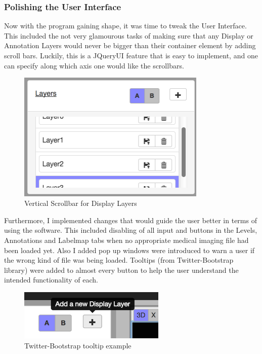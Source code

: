 \documentclass[a4paper,11pt,titlepage]{article}
\begin{document}
\subsubsection{Polishing the User Interface}

Now with the program gaining shape, it was time to tweak the User Interface. This included the not very glamourous tasks of making sure that any Display or Annotation Layers would never be bigger than their container element by adding scroll bars. Luckily, this is a JQueryUI feature that is easy to implement, and one can specify along which axis one would like the scrollbars.

\begin{figure}[ht!]
\centering
\includegraphics[width=90mm]{graphics/scrollbar_01.png}
\caption{Vertical Scrollbar for Display Layers}
\label{fig:UIdesign1}
\end{figure}

Furthermore, I implemented changes that would guide the user better in terms of using the software. This included disabling of all input and buttons in the Levels, Annotations and Labelmap tabs when no appropriate medical imaging file had been loaded yet. Also I added pop up windows were introduced to warn a user if the wrong kind of file was being loaded. Tooltips (from Twitter-Bootstrap library) were added to almost every button to help the user understand the intended functionality of each.


\begin{figure}[ht!]
\centering
\includegraphics[width=70mm]{graphics/tooltipExample_01.png}
\caption{Twitter-Bootstrap tooltip example}
\label{fig:UIdesign1}
\end{figure}
\end{document}
